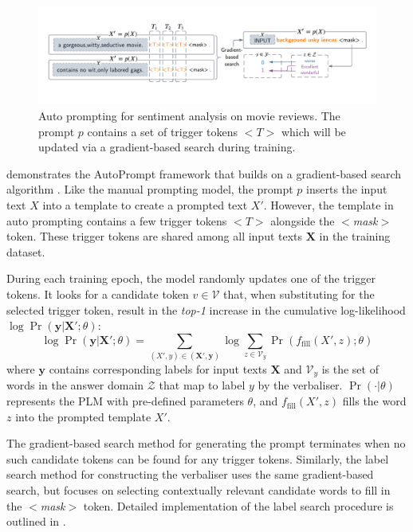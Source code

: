 \vspace{-0.5em}
\begin{figure}[!ht]
    \centering
    \includegraphics[width=\hsize]{figures/preparation_media/prepare-auto.pdf}
    \caption{Auto prompting for sentiment analysis on movie reviews. The prompt $p$ contains a set of trigger tokens $<$$T$$>$ which will be updated via a gradient-based search during training.}
    \label{fig:prepare-auto}
\end{figure}
\vspace{-0.5em}

 demonstrates the AutoPrompt framework that builds on a gradient-based search algorithm \cite{wallace19Gradientsearch}. Like the manual prompting model, the prompt $p$ inserts the input text $X$ into a template to create a prompted text $X'$. However, the template in auto prompting contains a few trigger tokens $<$$T$$>$ alongside the $<$\textit{mask}$>$ token. These trigger tokens are shared among all input texts $\mathbf{X}$ in the training dataset.

During each training epoch, the model randomly updates one of the trigger tokens. It looks for a candidate token $v \in \mathcal{V}$ that, when substituting for the selected trigger token, result in the \emph{top-1} increase in the cumulative log-likelihood $\log \Pr(\mathbf{y} | \mathbf{X}'; \theta)$:
\begin{equation} \label{eqn:cum_loglik}
    \log \Pr(\mathbf{y} | \mathbf{X}'; \theta) = \sum_{(X', y) \in (\mathbf{X}', \mathbf{y})} \log \sum_{z \in \mathcal{V}_y} \Pr(f_{\text{fill}}(X', z); \theta)
\end{equation}
where $\mathbf{y}$ contains corresponding labels for input texts $\mathbf{X}$ and $\mathcal{V}_y$ is the set of words in the answer domain $\mathcal{Z}$ that map to label $y$ by the verbaliser. $\Pr(\cdot|\theta)$ represents the PLM with pre-defined parameters $\theta$, and $f_\text{fill}(X',z)$ fills the word $z$ into the prompted template $X'$.

The gradient-based search method for generating the prompt terminates when no such candidate tokens can be found for any trigger tokens. Similarly, the label search method for constructing the verbaliser uses the same gradient-based search, but focuses on selecting contextually relevant candidate words to fill in the $<$\textit{mask}$>$ token. Detailed implementation of the label search procedure is outlined in .

